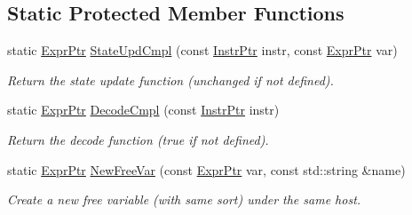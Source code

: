 \subsection*{Static Protected Member Functions}
\begin{DoxyCompactItemize}
\item 
\mbox{\label{classilang_1_1_unroller_ad2a70ff40cfa856f713724a8f2816002}} 
static \mbox{\hyperlink{namespaceilang_a7c4196c72e53ea4df4b7861af7bc3bce}{Expr\+Ptr}} \mbox{\hyperlink{classilang_1_1_unroller_ad2a70ff40cfa856f713724a8f2816002}{State\+Upd\+Cmpl}} (const \mbox{\hyperlink{namespaceilang_af88a19312ae653d687a0d1207bb284f6}{Instr\+Ptr}} instr, const \mbox{\hyperlink{namespaceilang_a7c4196c72e53ea4df4b7861af7bc3bce}{Expr\+Ptr}} var)
\begin{DoxyCompactList}\small\item\em Return the state update function (unchanged if not defined). \end{DoxyCompactList}\item 
\mbox{\label{classilang_1_1_unroller_ace0ee39e0fe0c7780d651429da992b87}} 
static \mbox{\hyperlink{namespaceilang_a7c4196c72e53ea4df4b7861af7bc3bce}{Expr\+Ptr}} \mbox{\hyperlink{classilang_1_1_unroller_ace0ee39e0fe0c7780d651429da992b87}{Decode\+Cmpl}} (const \mbox{\hyperlink{namespaceilang_af88a19312ae653d687a0d1207bb284f6}{Instr\+Ptr}} instr)
\begin{DoxyCompactList}\small\item\em Return the decode function (true if not defined). \end{DoxyCompactList}\item 
\mbox{\label{classilang_1_1_unroller_a546413a55a3db435f199a094eda9d790}} 
static \mbox{\hyperlink{namespaceilang_a7c4196c72e53ea4df4b7861af7bc3bce}{Expr\+Ptr}} \mbox{\hyperlink{classilang_1_1_unroller_a546413a55a3db435f199a094eda9d790}{New\+Free\+Var}} (const \mbox{\hyperlink{namespaceilang_a7c4196c72e53ea4df4b7861af7bc3bce}{Expr\+Ptr}} var, const std\+::string \&name)
\begin{DoxyCompactList}\small\item\em Create a new free variable (with same sort) under the same host. \end{DoxyCompactList}\end{DoxyCompactItemize}
